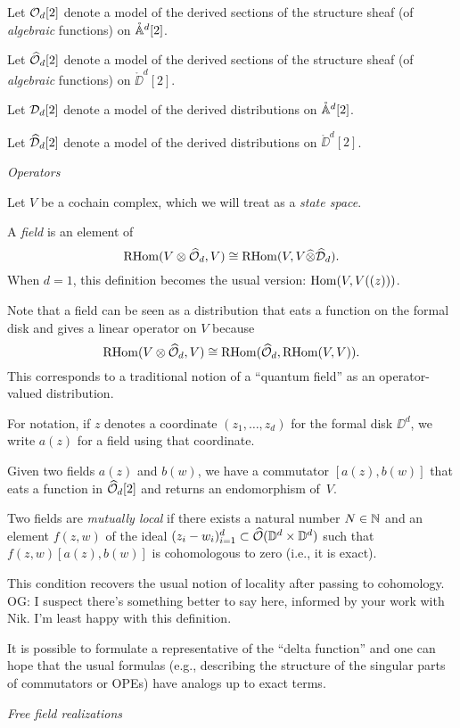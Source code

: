 \documentclass[11pt]{amsart}
\def\RHom{{\rm RHom}}
\def\owen#1{{\textcolor{violet!65!black}{OG: {#1}}}}
\begin{document}
Let $\cO_d{[2]}$ denote a model of the derived sections of the structure sheaf (of {\em algebraic} functions) on $\mathring{\AA}^d[2]$.

Let $\widehat{\cO}_d{[2]}$ denote a model of the derived sections of the structure sheaf (of {\em algebraic} functions) on $\mathring{\DD}^d[2]$.

Let $\cD_d[2]$ denote a model of the derived distributions on $\mathring{\AA}^d[2]$.

Let $\widehat{\cD}_d[2]$ denote a model of the derived distributions on $\mathring{\DD}^d[2]$.
\newpage

{\it Operators}

Let $V$ be a cochain complex, which we will treat as a {\em state space}.

A {\em field} is an element of 
\[
\RHom(V \otimes \widehat{\cO}_d, V) \cong \RHom(V, V \widehat{\otimes} \widehat{\cD}_d).
\]
When $d=1$, this definition becomes the usual version: $\Hom(V, V((z)))$.

Note that a field can be seen as a distribution that eats a function on the formal disk and gives a linear operator on $V$ because
\[
\RHom(V \otimes \widehat{\cO}_d, V) \cong \RHom(\widehat{\cO}_d, \RHom(V,V)).
\]
This corresponds to a traditional notion of a ``quantum field'' as an operator-valued distribution.

For notation, if $z$ denotes a coordinate $(z_1,\ldots,z_d)$ for the formal disk $\DD^d$,
we write $a(z)$ for a field using that coordinate.

Given two fields $a(z)$ and $b(w)$, we have a commutator $[a(z),b(w)]$ that eats a function in $\widehat{\cO}_d[2]$ and returns an endomorphism of~$V$.

Two fields are {\em mutually local} if there exists a natural number $N \in \NN$ and an element $f(z,w)$ of the ideal $(z_i-w_i)_{i =1}^d \subset \widehat{\cO}(\DD^d\times \DD^d)$ such that $f(z,w)[a(z),b(w)]$ is cohomologous to zero (i.e., it is exact).

This condition recovers the usual notion of locality after passing to cohomology. 
\owen{I suspect there's something better to say here, informed by your work with Nik. I'm least happy with this definition.}

It is possible to formulate a representative of the ``delta function'' and one can hope that the usual formulas (e.g., describing the structure of the singular parts of commutators or OPEs) have analogs up to exact terms.

{\it Free field realizations}
\end{document}
